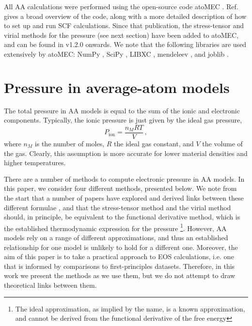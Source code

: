 \documentclass[%
 preprint,
 superscriptaddress,
 amsmath,amssymb,
longbibliography,
]{revtex4-2}
\begin{document}
All AA calculations were performed using the open-source code atoMEC \cite{atoMEC,SciPy_atoMEC}. Ref.~\cite{SciPy_atoMEC} gives a broad overview of the code, along with a more detailed description of how to set up and run SCF calculations. Since that publication, the stress-tensor and virial methods for the pressure (see next section) have been added to atoMEC, and can be found in v1.2.0 onwards. We note that the following libraries are used extensively by atoMEC: NumPy \cite{numpy}, SciPy \cite{scipy}, LIBXC \cite{libxc_2018}, mendeleev \cite{mendeleev2014}, and joblib \cite{joblib}. 

\section{Pressure in average-atom models}\label{sec:AA_P}

The total pressure in AA models is equal to the sum of the ionic and electronic components. Typically, the ionic pressure is just given by the ideal gas pressure,
\begin{equation}\label{eq:P_ion}
    P_\textrm{ion} = \frac{n_{M}RT}{V}\,,
\end{equation}
where $n_{M}$ is the number of moles, $R$ the ideal gas constant, and $V$ the volume of the gas. Clearly, this assumption is more accurate for lower material densities and higher temperatures.

There are a number of methods to compute electronic pressure in AA models. In this paper, we consider four different methods, presented below. We note from the start that a number of papers have explored and derived links between these different formulae \cite{More_QSM,stress_tensor_more,Pressure_warm_hot,Pain_virial}, and that the stress-tensor method and the virial method should, in principle, be equivalent to the functional derivative method, which is the established thermodynamic expression for the pressure \footnote{The ideal approximation, as implied by the name, is a known approximation, and cannot be derived from the functional derivative of the free energy}. However, AA models rely on a range of different approximations, and thus an established relationship for one model is unlikely to hold for a different one. Moreover, the aim of this paper is to take a practical approach to EOS calculations, i.e. one that is informed by comparisons to first-principles datasets. Therefore, in this work we present the methods as we use them, but we do not attempt to draw theoretical links between them.
\end{document}
